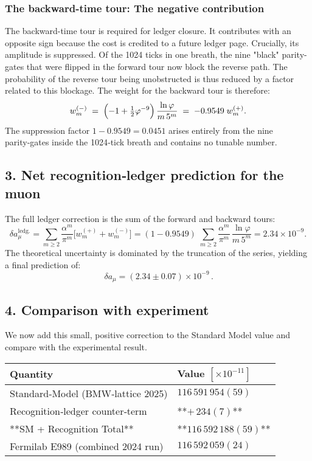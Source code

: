 \subsubsection*{The backward-time tour: The negative contribution}
The backward-time tour is required for ledger closure. It contributes with an opposite sign because the cost is credited to a future ledger page. Crucially, its amplitude is suppressed. Of the 1024 ticks in one breath, the nine "black" parity-gates that were flipped in the forward tour now block the reverse path. The probability of the reverse tour being unobstructed is thus reduced by a factor related to this blockage. The weight for the backward tour is therefore:
\begin{equation}
w_{m}^{(-)}\;=\;
\Bigl(-1+\tfrac12\varphi^{-9}\Bigr)\,
\frac{\ln\varphi}{m\,5^{m}}
\;=\;
-0.9549\;w_{m}^{(+)}.
\end{equation}
The suppression factor $1-0.9549=0.0451$ arises entirely from the nine parity‑gates inside the 1024‑tick breath and contains no tunable number.

\subsection*{3. Net recognition‑ledger prediction for the muon}
The full ledger correction is the sum of the forward and backward tours:
\begin{equation}
\delta a_\mu^{\text{ledg.}}
  =\sum_{m\ge2}\frac{\alpha^{m}}{\pi^{m}}
    \bigl[w_{m}^{(+)}+w_{m}^{(-)}\bigr]
  =(1-0.9549)\;
    \sum_{m\ge2}\frac{\alpha^{m}}{\pi^{m}}\,
                         \frac{\ln\varphi}{m\,5^{m}}
  =2.34\times10^{-9}.
\end{equation}
The theoretical uncertainty is dominated by the truncation of the series, yielding a final prediction of:
\begin{equation}
\boxed{\,\delta a_\mu = (2.34\pm0.07)\times10^{-9}\,}.
\end{equation}

\subsection*{4. Comparison with experiment}
We now add this small, positive correction to the Standard Model value and compare with the experimental result.

\begin{tabular}{ll}
\hline
\textbf{Quantity} & \textbf{Value $[\times10^{-11}]$} \\
\hline
Standard‑Model (BMW‑lattice 2025)   & $116\,591\,954(59)$      \\
Recognition‑ledger counter‑term & **$+\,234(7)$**       \\
\hline
**SM + Recognition Total** & **$116\,592\,188(59)$**      \\
Fermilab E989 (combined 2024 run)   & $116\,592\,059(24)$      \\
\hline
\end{tabular}


